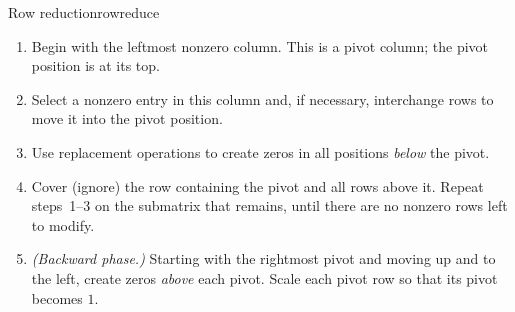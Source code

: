 \documentclass[11pt]{article}
\begin{document}
\begin{proc}{Row reduction}{rowreduce}
\begin{enumerate}[itemsep=2pt]
  \item Begin with the leftmost nonzero column. This is a pivot column; the pivot position is at its top.
  \item Select a nonzero entry in this column and, if necessary, interchange rows to move it into the pivot
        position.
  \item Use replacement operations to create zeros in all positions \emph{below} the pivot.
  \item Cover (ignore) the row containing the pivot and all rows above it. Repeat steps~1--3 on the
        submatrix that remains, until there are no nonzero rows left to modify.
  \item \emph{(Backward phase.)} Starting with the rightmost pivot and moving up and to the left, create
        zeros \emph{above} each pivot. Scale each pivot row so that its pivot becomes $1$.
\end{enumerate}
\end{proc}
 
\end{document}
